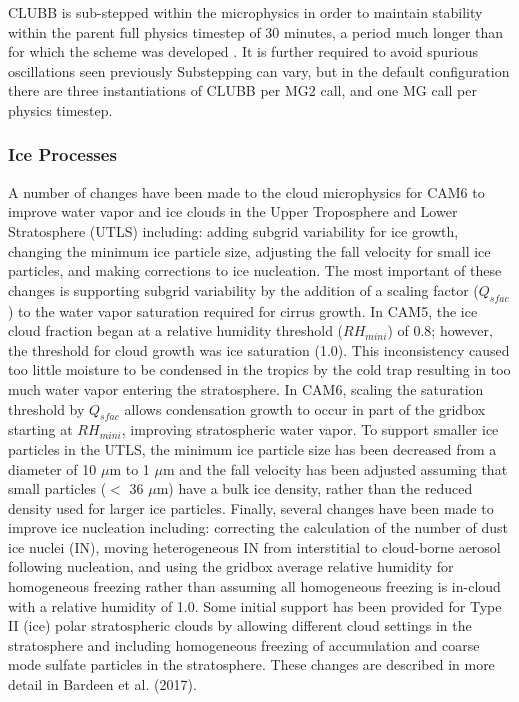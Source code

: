 CLUBB is sub-stepped within the microphysics in order to maintain stability within the parent full physics timestep of 30 minutes, a period much longer than for which the scheme was developed \citep{Golaz2002}. It is further required to avoid spurious oscillations seen previously \citep{Zheng2017}  Substepping can vary, but in the default configuration there are three instantiations of CLUBB per MG2 call, and one MG call per physics timestep.

\subsubsection{Ice Processes}

A number of changes have been made to the cloud microphysics for CAM6 to improve water vapor and ice clouds in the Upper Troposphere and Lower Stratosphere (UTLS) including: adding subgrid variability for ice growth, changing the minimum ice particle size, adjusting the fall velocity for small ice particles, and making corrections to ice nucleation. The most important of these changes is supporting subgrid variability by the addition of a scaling factor ($Q_{sfac}$) to the water vapor saturation required for cirrus growth. In CAM5, the ice cloud fraction began at a relative humidity threshold ($RH_{mini}$) of 0.8; however, the threshold for cloud growth was ice saturation (1.0). This inconsistency caused too little moisture to be condensed in the tropics by the cold trap resulting in too much water vapor entering the stratosphere. In CAM6, scaling the saturation threshold by $Q_{sfac}$ allows condensation growth to occur in part of the gridbox starting at $RH_{mini}$, improving stratospheric water vapor. To support smaller ice particles in the UTLS, the minimum ice particle size has been decreased from a diameter of 10 $\mu$m to 1 $\mu$m and the fall velocity has been adjusted assuming that small particles ($<$ 36 $\mu$m) have a bulk ice density, rather than the reduced density used for larger ice particles. Finally, several changes have been made to improve ice nucleation including: correcting the calculation of the number of dust ice nuclei (IN), moving heterogeneous IN from interstitial to cloud-borne aerosol following nucleation, and using the gridbox average relative humidity for homogeneous freezing rather than assuming all homogeneous freezing is in-cloud with a relative humidity of 1.0. Some initial support has been provided for Type II (ice) polar stratospheric clouds by allowing different cloud settings in the stratosphere and including homogeneous freezing of accumulation and coarse mode sulfate particles in the stratosphere. These changes are described in more detail in Bardeen et al. (2017).

